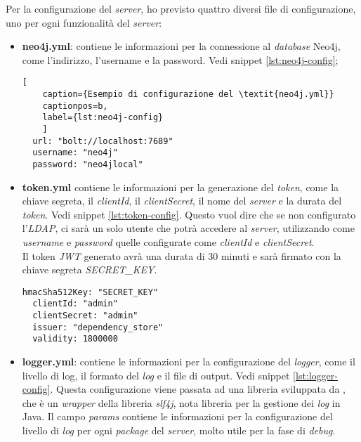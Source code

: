 Per la configurazione del \textit{server}, ho previsto quattro diversi file di configurazione, uno per ogni funzionalità del \textit{server}:
\begin{itemize}
  \item \textbf{neo4j.yml}: contiene le informazioni per la connessione al \textit{database} Neo4j, come l'indirizzo, l'username e la password. Vedi snippet \ref*{lst:neo4j-config};
  \begin{lstlisting}[
    caption={Esempio di configurazione del \textit{neo4j.yml}}
    captionpos=b, 
    label={lst:neo4j-config}
    ]
  url: "bolt://localhost:7689"
  username: "neo4j"
  password: "neo4jlocal"
  \end{lstlisting}
  \item \textbf{token.yml} contiene le informazioni per la generazione del \textit{token}, come la chiave segreta, il \textit{clientId}, il \textit{clientSecret}, il
    nome del \textit{server} e la durata del \textit{token}. Vedi snippet \ref*{lst:token-config}.
    Questo vuol dire che se non configurato l'\textit{LDAP}, ci sarà un solo utente che potrà accedere al \textit{server}, 
    utilizzando come \textit{username} e \textit{password} quelle configurate come \textit{clientId} e \textit{clientSecret}.\\
    Il token \textit{JWT} generato avrà una durata di 30 minuti e sarà firmato con la chiave segreta \textit{SECRET\_KEY}.
    \begin{lstlisting}[caption={Esempio di configurazione del \textit{token.yml}.},captionpos=b, label={lst:token-config}]
  hmacSha512Key: "SECRET_KEY"
  clientId: "admin"
  clientSecret: "admin"
  issuer: "dependency_store"
  validity: 1800000
    \end{lstlisting}
  \item \textbf{logger.yml}: contiene le informazioni per la configurazione del \textit{logger}, come il livello di log, il formato del \textit{log} e il file di output. Vedi snippet \ref*{lst:logger-config}.
    Questa configurazione viene passata ad una libreria sviluppata da \azienda{}, che è un \textit{wrapper} della libreria \textit{slf4j}, nota libreria per la gestione dei \textit{log} in Java.
    Il campo \textit{params} contiene le informazioni per la configurazione del livello di \textit{log} per ogni \textit{package} del \textit{server}, molto utile per la fase di \textit{debug}.
    \begin{lstlisting}[caption={Esempio di configurazione del \textit{logger.yml}.},captionpos=b, label={lst:logger-config}]

\end{lstlisting}
\end{itemize}
